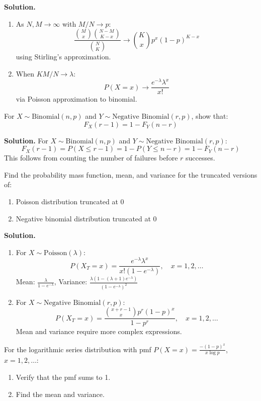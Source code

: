 \noindent\textbf{Solution.}
\begin{enumerate}[label=(\alph*)]
\item As \( N,M \to \infty \) with \( M/N \to p \):
\[
\frac{\binom{M}{x}\binom{N-M}{K-x}}{\binom{N}{K}} \to \binom{K}{x}p^x(1-p)^{K-x}
\]
using Stirling's approximation.

\item When \( KM/N \to \lambda \):
\[
P(X=x) \to \frac{e^{-\lambda}\lambda^x}{x!}
\]
via Poisson approximation to binomial.
\end{enumerate}

\begin{problembox}
For \( X \sim \text{Binomial}(n,p) \) and \( Y \sim \text{Negative Binomial}(r,p) \), show that:
\[
F_X(r-1) = 1 - F_Y(n-r)
\]
\end{problembox}

\noindent\textbf{Solution.}
For \( X \sim \text{Binomial}(n,p) \) and \( Y \sim \text{Negative Binomial}(r,p) \):
\[
F_X(r-1) = P(X \leq r-1) = 1 - P(Y \leq n-r) = 1 - F_Y(n-r)
\]
This follows from counting the number of failures before \( r \) successes.

\begin{problembox}
Find the probability mass function, mean, and variance for the truncated versions of:
\begin{enumerate}[label=(\alph*)]
\item Poisson distribution truncated at 0
\item Negative binomial distribution truncated at 0
\end{enumerate}
\end{problembox}

\noindent\textbf{Solution.}
\begin{enumerate}[label=(\alph*)]
\item For \( X \sim \text{Poisson}(\lambda) \):
\[
P(X_T=x) = \frac{e^{-\lambda}\lambda^x}{x!(1-e^{-\lambda})}, \quad x=1,2,\ldots
\]
Mean: \( \frac{\lambda}{1-e^{-\lambda}} \), Variance: \( \frac{\lambda(1-(\lambda+1)e^{-\lambda})}{(1-e^{-\lambda})^2} \)

\item For \( X \sim \text{Negative Binomial}(r,p) \):
\[
P(X_T=x) = \frac{\binom{x+r-1}{x}p^r(1-p)^x}{1-p^r}, \quad x=1,2,\ldots
\]
Mean and variance require more complex expressions.
\end{enumerate}

\begin{problembox}
For the logarithmic series distribution with pmf \( P(X=x) = \frac{-(1-p)^x}{x\log p} \), \( x=1,2,\ldots \):
\begin{enumerate}[label=(\alph*)]
\item Verify that the pmf sums to 1.
\item Find the mean and variance.
\end{enumerate}
\end{problembox}

